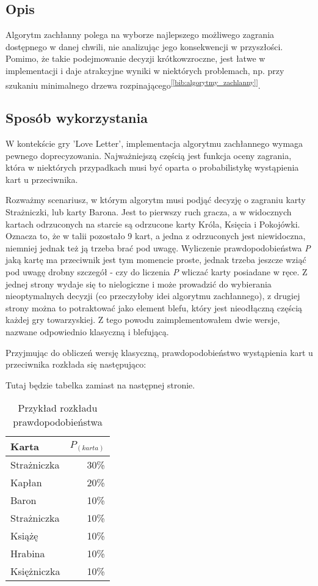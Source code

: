 \subsection{Opis}
Algorytm zachłanny polega na wyborze najlepszego możliwego zagrania dostępnego w danej chwili, nie analizując jego konsekwencji w przyszłości. Pomimo, że takie podejmowanie decyzji krótkowzroczne, jest łatwe w implementacji i daje atrakcyjne wyniki w niektórych problemach, np. przy szukaniu minimalnego drzewa rozpinającego\textsuperscript{[\ref{bib:algorytmy_zachlanny}]}.

\subsection{Sposób wykorzystania}

W kontekście gry 'Love Letter', implementacja algorytmu zachłannego wymaga pewnego doprecyzowania. Najważniejszą częścią jest funkcja oceny zagrania, która w niektórych przypadkach musi być oparta o probabilistykę wystąpienia kart u przeciwnika. 

Rozważmy scenariusz, w którym algorytm musi podjąć decyzję o zagraniu karty Strażniczki, lub karty Barona. Jest to pierwszy ruch gracza, a w widocznych kartach odrzuconych na starcie są odrzucone karty Króla, Księcia i Pokojówki. Oznacza to, że w talii pozostało 9 kart, a jedna z odrzuconych jest niewidoczna, niemniej jednak też ją trzeba brać pod uwagę. Wyliczenie prawdopodobieństwa \textit{P} jaką kartę ma przeciwnik jest tym momencie proste, jednak trzeba jeszcze wziąć pod uwagę drobny szczegół - czy do liczenia \textit{P} wliczać karty posiadane w ręce. Z jednej strony wydaje się to nielogiczne i może prowadzić do wybierania nieoptymalnych decyzji (co przeczyłoby idei algorytmu zachłannego), z drugiej strony można to potraktować jako element blefu, który jest nieodłączną częścią każdej gry towarzyskiej. Z tego powodu zaimplementowałem dwie wersje, nazwane odpowiednio klasyczną i blefującą.

Przyjmując do obliczeń wersję klasyczną, prawdopodobieństwo wystąpienia kart u przeciwnika rozkłada się następująco:


\begin{center}
	Tutaj będzie tabelka zamiast na następnej stronie. %
\end{center}

\clearpage
\begin{table}[t]
	\caption{Przykład rozkładu prawdopodobieństwa}
	\centering
		\begin{tabular}{|l|r|}
			\hline
			Karta & $P_{(karta)}$	\\ \hline
			Strażniczka & 30\% 			\\ \hline
			Kapłan & 20\% 				\\ \hline
			Baron & 10\% 				\\ \hline
			Strażniczka & 10\% 			\\ \hline
			Książę & 10\% 				\\ \hline
			Hrabina & 10\% 				\\ \hline
			Księżniczka & 10\% 			\\ \hline
		\end{tabular}
\end{table}

